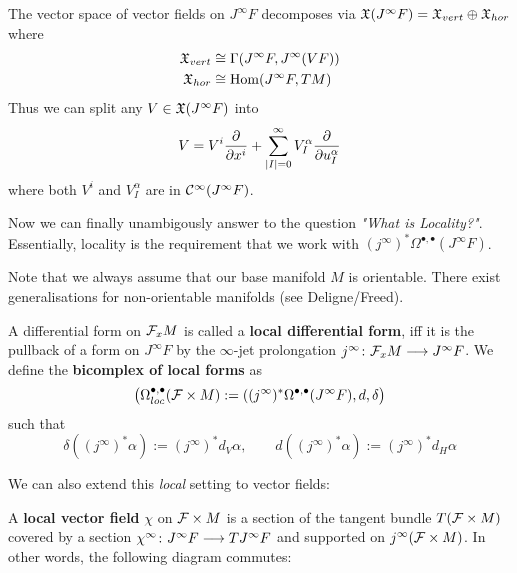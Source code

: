 \begin{corollary}
  The vector space of vector fields on $J^\infty F$ decomposes via $\mathfrak{X}(J^\infty F) = \mathfrak{X}_{vert} \oplus \mathfrak{X}_{hor}$ where
  \begin{align}
    \mathfrak{X}_{vert} &\cong \Gamma(J^\infty F, J^\infty(VF))\\
    \mathfrak{X}_{hor} &\cong \operatorname{Hom}(J^\infty F, TM)
  \end{align}
  Thus we can split any $V \in \mathfrak{X}(J^\infty F)$ into
  $$ V = V^i \frac{\partial }{\partial x^i} + \sum_{|I|=0}^\infty V^\alpha_I \frac{\partial }{\partial u^\alpha_I} $$
  where both $V^i$ and $V^\alpha_I$ are in $\mathcal{C}^{\infty}(J^\infty F)$.
\end{corollary}

Now we can finally unambigously answer to the question \emph{"What is Locality?"}. Essentially, locality is the requirement that we work with $(j^\infty)^* \Omega^{\bullet, \bullet}(J^\infty F)$.

\begin{rem}
  Note that we always assume that our base manifold $M$ is orientable. There exist generalisations for non-orientable manifolds (see Deligne/Freed).
\end{rem}

\begin{definition}
  A differential form on ${\mathcal{F}}_x M$ is called a \textbf{local differential form}, iff it is the pullback of a form on $J^\infty F$ by the $\infty$-jet prolongation $j^\infty\colon {\mathcal{F}}_x M \longrightarrow J^\infty F$. We define the \textbf{bicomplex of local forms} as
  $$ \left( \Omega^{\bullet, \bullet}_{loc} ({\mathcal{F}} \times M) := ((j^\infty )^* \Omega^{\bullet, \bullet} (J^\infty F), d, \delta \right) $$
  such that
  $$ \delta((j^\infty)^* \alpha) := (j^\infty)^* d_V \alpha, \quad \quad d((j^\infty)^* \alpha) := (j^\infty)^* d_H \alpha $$
\end{definition}

We can also extend this \emph{local} setting to vector fields:

\begin{definition}
  A \textbf{local vector field} $\chi$ on ${\mathcal{F}} \times M$ is a section of the tangent bundle $T({\mathcal{F}}\times M)$ covered by a section $\chi^\infty\colon J^\infty F \longrightarrow TJ^\infty F$ and supported on $j^\infty({\mathcal{F}} \times M)$. In other words, the following diagram commutes:
  \begin{center}
  \end{center}
\end{definition}


